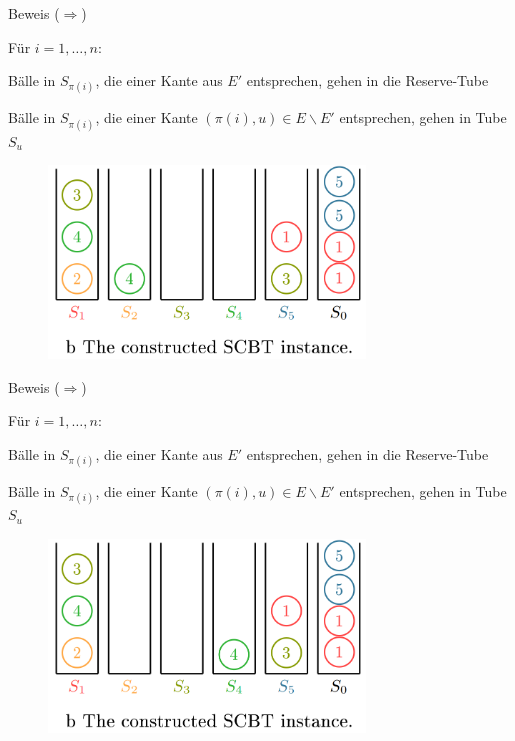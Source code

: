 \documentclass{beamer}
\begin{document}
\begin{frame}{Beweis (\glqq $\Rightarrow$\grqq)}
\begin{pointlist}
\item Für $i=1,\dots,n$:
\begin{arrowlist}
\item Bälle in $S_{\pi(i)}$, die einer Kante aus $E'$ entsprechen, gehen in die Reserve-Tube 
\item Bälle in $S_{\pi(i)}$, die einer Kante $(\pi(i),u)\in E\backslash E'$ entsprechen, gehen in Tube $S_u$
\end{arrowlist}
\end{pointlist}
\begin{figure}
    \centering
    \includegraphics[width=0.75\textwidth]{proofr1}
\end{figure}
\end{frame}


\begin{frame}{Beweis (\glqq $\Rightarrow$\grqq)}
\begin{pointlist}
\item Für $i=1,\dots,n$:
\begin{arrowlist}
\item Bälle in $S_{\pi(i)}$, die einer Kante aus $E'$ entsprechen, gehen in die Reserve-Tube 
\item Bälle in $S_{\pi(i)}$, die einer Kante $(\pi(i),u)\in E\backslash E'$ entsprechen, gehen in Tube $S_u$
\end{arrowlist}
\end{pointlist}
\begin{figure}
    \centering
    \includegraphics[width=0.75\textwidth]{proofr2}
\end{figure}
\end{frame}
\end{document}
